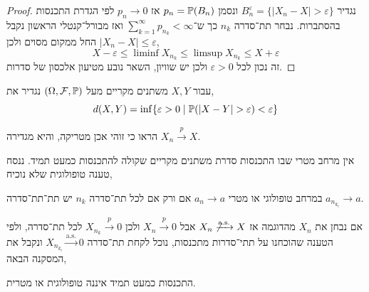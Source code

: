 \begin{proof}
	נגדיר $B_n^\varepsilon = \{ |X_n - X| > \varepsilon \}$ ונסמן $p_n = \mathbb{P}(B_n)$ אז $p_n \to 0$ לפי הגדרת התכנסות בהסתברות.
	נבחר תת־סדרה $n_k$ כך ש־$\sum_{k = 1}^\infty p_{n_k} < \infty$ ואז מבורל־קנטלי הראשון נקבל $|X_n - X| \le \varepsilon$ החל ממקום מסוים ולכן,
	\[
		X - \varepsilon \le \liminf X_{n_k} \le \limsup X_{n_k} \le X + \varepsilon
	\]
	זה נכון לכל $\varepsilon > 0$ ולכן יש שוויון, השאר נובע מטיעון אלכסון של סדרות.
\end{proof}
\begin{definition}
	עבור $X, Y$ משתנים מקריים מעל $(\Omega, \mathcal{F}, \mathbb{P})$ נגדיר את,
	\[
		d(X, Y) = \inf\{ \varepsilon > 0 \mid \mathbb{P}(|X - Y| > \varepsilon) < \varepsilon \}
	\]
\end{definition}
\begin{exercise}
	הראו כי זוהי אכן מטריקה, והיא מגדירה $X_n \xrightarrow{p} X$.
\end{exercise}
אין מרחב מטרי שבו התכנסות סדרת משתנים מקריים שקולה להתכנסות כמעט תמיד.
ננסח טענה טופולוגית שלא נוכיח,
\begin{proposition}
	במרחב טופולוגי או מטרי $a_n \to a$ אם ורק אם לכל תת־סדרה $n_k$ יש תת־תת־סדרה $a_{n_{k_i}} \to a$.
\end{proposition}
אם נבחן את $X_n$ מהדוגמה אז $X_n \not\xrightarrow{\text{a.s.}} X$ אבל $X_n \xrightarrow{p} 0$ ולכן $X_{n_k} \xrightarrow{p} 0$ לכל תת־סדרה, ולפי הטענה שהוכחנו על תתי־סדרות מתכנסות,
נוכל לקחת תת־סדרה $X_{n_{k_i}} \xrightarrow{\text{a.s.}} 0$ ונקבל את המסקנה הבאה,
\begin{corollary}
	התכנסות כמעט תמיד איננה טופולוגית או מטרית.
\end{corollary}

